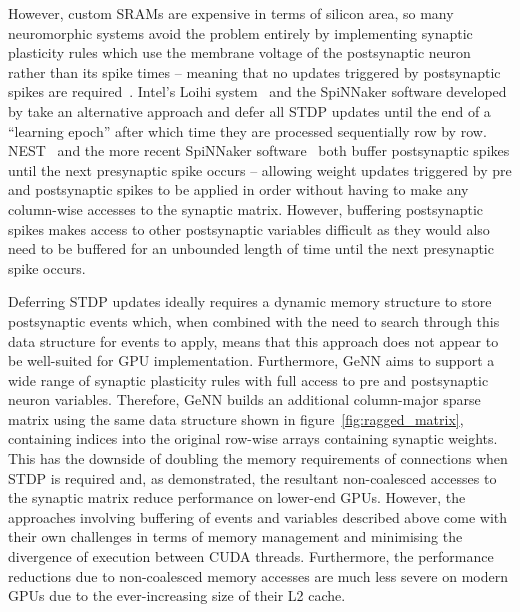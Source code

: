 \documentclass[utf8]{frontiersSCNS} %
\begin{document}
However, custom SRAMs are expensive in terms of silicon area, so many neuromorphic systems avoid the problem entirely by implementing synaptic plasticity rules which use the membrane voltage of the postsynaptic neuron rather than its spike times -- meaning that no updates triggered by postsynaptic spikes are required~\citep{Frenkel2018,Qiao2015}.
Intel's Loihi system~\citep{Davies2018} and the SpiNNaker software developed by \citet{Galluppi2014a} take an alternative approach and defer all STDP updates until the end of a ``learning epoch'' after which time they are processed sequentially row by row.
NEST~\citep{Morrison2007} and the more recent SpiNNaker software~\citep{Knight2016} both buffer postsynaptic spikes until the next presynaptic spike occurs -- allowing weight updates triggered by pre and postsynaptic spikes to be applied in order without having to make any column-wise accesses to the synaptic matrix. 
However, buffering postsynaptic spikes makes access to other postsynaptic variables difficult as they would also need to be buffered for an unbounded length of time until the next presynaptic spike occurs.

Deferring STDP updates ideally requires a dynamic memory structure to store postsynaptic events which, when combined with the need to search through this data structure for events to apply, means that this approach does not appear to be well-suited for GPU implementation.
Furthermore, GeNN aims to support a wide range of synaptic plasticity rules with full access to pre and postsynaptic neuron variables.
Therefore, GeNN builds an additional column-major sparse matrix using the same data structure shown in figure~\ref{fig:ragged_matrix}, containing indices into the original row-wise arrays containing synaptic weights.
This has the downside of doubling the memory requirements of connections when STDP is required and, as \citet{Yavuz2016} demonstrated, the resultant non-coalesced accesses to the synaptic matrix reduce performance on lower-end GPUs. 
However, the approaches involving buffering of events and variables described above come with their own challenges in terms of memory management and minimising the divergence of execution between CUDA threads.
Furthermore, the performance reductions due to non-coalesced memory accesses are much less severe on modern GPUs due to the ever-increasing size of their L2 cache.
\end{document}

